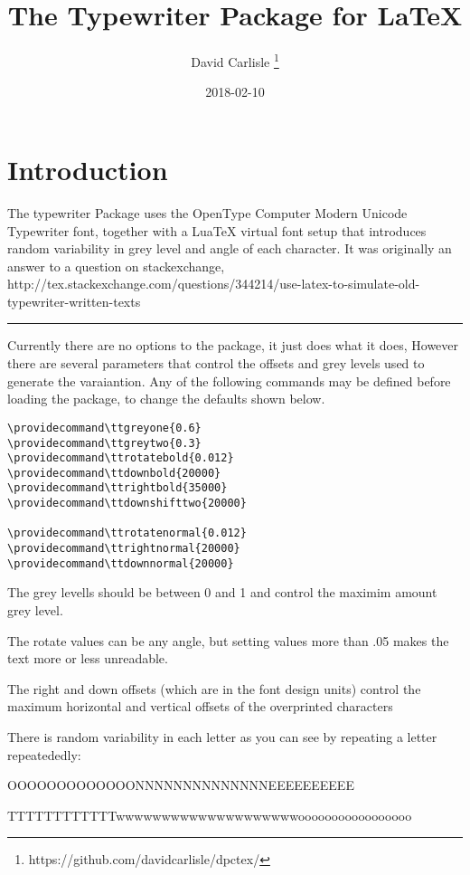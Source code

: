 \documentclass{article}
\begin{document}
\title{The Typewriter Package for LaTeX}
\author{David Carlisle \thanks{https://github.com/davidcarlisle/dpctex/}}
\date{2018-02-10}

\maketitle

\section{Introduction}
The typewriter Package uses the OpenType Computer Modern Unicode
Typewriter font, together with a LuaTeX virtual font setup that
introduces random variability in grey level and angle of each
character. It was originally an answer to a question on stackexchange,
http://tex.stackexchange.com/questions/344214/use-latex-to-simulate-old-typewriter-written-texts


\hrule

Currently there are no options to the package, it just does what it
does, However there are several parameters that control the offsets
and grey levels used to generate the varaiantion. Any of the following
commands may be defined before loading the package, to change the defaults shown below.

\begin{verbatim}
\providecommand\ttgreyone{0.6}
\providecommand\ttgreytwo{0.3}
\providecommand\ttrotatebold{0.012}
\providecommand\ttdownbold{20000}
\providecommand\ttrightbold{35000}
\providecommand\ttdownshifttwo{20000}

\providecommand\ttrotatenormal{0.012}
\providecommand\ttrightnormal{20000}
\providecommand\ttdownnormal{20000}
\end{verbatim}

The grey levells should be between 0 and 1 and control the maximim
amount grey level.

The rotate values can be any angle, but setting values more than .05 
makes the text more or less unreadable.

The right and down offsets (which are in the font design units) control the
maximum horizontal and vertical offsets of the overprinted characters

There is random variability in each letter as you can see by repeating
a letter repeatededly:

OOOOOOOOOOOOONNNNNNNNNNNNNNEEEEEEEEEE

TTTTTTTTTTTTwwwwwwwwwwwwwwwwwwwwooooooooooooooooo
\end{document}
